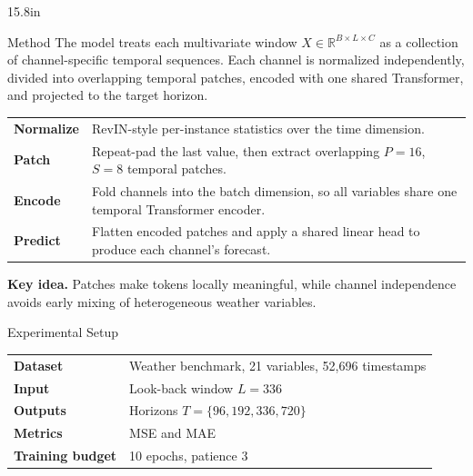 \documentclass[final]{beamer}
\begin{document}
\begin{frame}[t]
\begin{columns}[t,totalwidth=33.2in]
\begin{column}{15.8in}
\begin{block}{Method}
The model treats each multivariate window \(X\in\mathbb{R}^{B\times L\times C}\) as a collection of channel-specific temporal sequences. Each channel is normalized independently, divided into overlapping temporal patches, encoded with one shared Transformer, and projected to the target horizon.

\vspace{0.2em}
\begin{center}
\begin{tabular}{>{\bfseries}p{2.8in}p{11.8in}}
\toprule
Normalize & RevIN-style per-instance statistics over the time dimension. \\
Patch & Repeat-pad the last value, then extract overlapping \(P=16\), \(S=8\) temporal patches. \\
Encode & Fold channels into the batch dimension, so all variables share one temporal Transformer encoder. \\
Predict & Flatten encoded patches and apply a shared linear head to produce each channel's forecast. \\
\bottomrule
\end{tabular}
\end{center}

\vspace{0.15em}
\textbf{Key idea.} Patches make tokens locally meaningful, while channel independence avoids early mixing of heterogeneous weather variables.
\end{block}

\begin{block}{Experimental Setup}
\begin{center}
\begin{tabular}{>{\bfseries}p{3.0in}p{11.6in}}
\toprule
Dataset & Weather benchmark, 21 variables, 52,696 timestamps \\
Input & Look-back window \(L=336\) \\
Outputs & Horizons \(T=\{96,192,336,720\}\) \\
Metrics & MSE and MAE \\
Training budget & 10 epochs, patience 3 \\
\bottomrule
\end{tabular}
\end{center}
\end{block}


\end{column}
\end{columns}
\end{frame}
\end{document}
